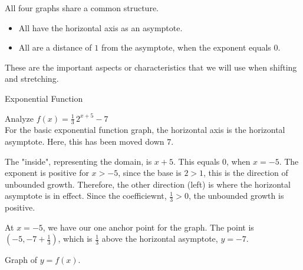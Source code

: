 \documentclass{ximera}
\begin{document}
All four graphs share a common structure.


\begin{itemize}
\item All have the horizontal axis as an asymptote.
\item All are a distance of $1$ from the asymptote, when the exponent equals $0$.
\end{itemize}

These are the important aspects or characteristics that we will use when shifting and stretching.






\begin{example}  Exponential Function



Analyze   $f(x) = \frac{1}{3} \, 2^{x+5} - 7$ \\


For the basic exponential function graph, the horizontal axis is the horizontal asymptote.  Here, this has been moved down $7$.



The "inside", representing the domain, is $x+5$.  This equals $0$, when $x=-5$.  The exponent is positive for $x>-5$, since the base is $2 > 1$, this is the direction of unbounded growth.  Therefore, the other direction (left) is where the horizontal asymptote is in effect.  Since the coefficiewnt, $\frac{1}{3} > 0$, the unbounded growth is positive.

At $x=-5$, we have our one anchor point for the graph.  The point is $\left(-5, -7 + \frac{1}{3}\right)$, which is $\frac{1}{3}$ above the horizontal asymptote, $y = -7$.


Graph of $y = f(x)$.

\begin{image}
\end{image}
\end{example}
\end{document}
